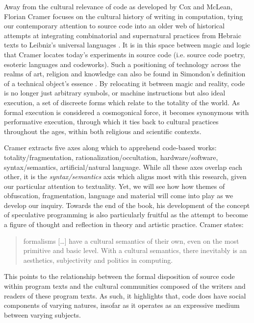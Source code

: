 Away from the cultural relevance of code as developed by Cox and McLean, Florian Cramer focuses on the cultural history of writing in computation, tying our contemporary attention to source code into an older web of historical attempts at integrating combinatorial and supernatural practices from Hebraic texts to Leibniz's universal languages \citep{cramer_words_2003}. It is in this space between magic and logic that Cramer locates today's experiments in source code (i.e. source code poetry, esoteric languages and codeworks). Such a positioning of technology across the realms of art, religion and knowledge can also be found in Simondon's definition of a technical object's essence \citep{simondon_mode_1958}. By relocating it between magic and reality, code is no longer just arbitrary symbols, or machine instructions but also ideal execution, a set of discreete forms which relate to the totality of the world. As formal execution is considered a cosmogonical force, it becomes synonymous with performative execution, through which it ties back to cultural practices throughout the ages, within both religious and scientific contexts.

Cramer extracts five axes along which to apprehend code-based works: totality/fragmentation, rationalization/occultation, hardware/software, syntax/semantics, artificial/natural language. While all these axes overlap each other, it is the \emph{syntax/semantics} axis which aligns most with this research, given our particular attention to textuality. Yet, we will see how how themes of obfuscation, fragmentation, language and material will come into play as we develop our inquiry. Towards the end of the book, his development of the concept of speculative programming is also particularly fruitful as the attempt to become a figure of thought and reflection in theory and artistic practice. Cramer states:

\begin{quote}
    formalisms [\dots] have a cultural semantics of their own, even on the most primitive and basic level. With a cultural semantics, there inevitably is an aesthetics, subjectivity and politics in computing. \citep{cramer_words_2003}
\end{quote}

This points to the relationship between the formal disposition of source code within program texts and the cultural communities composed of the writers and readers of these program texts. As such, it highlights that, code does have social components of varying natures, insofar as it operates as an expressive medium between varying subjects.


